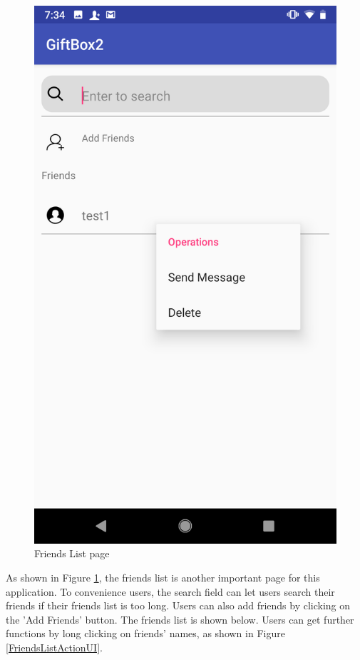 \begin{figure}[htb]
\begin{minipage}[t]{0.5\textwidth}
\includegraphics[width=.95\textwidth]{section03/assets/FriendsListAction.png}
\subcaption{\label{FriendsListActionUI}}
\end{minipage}%
\caption[Short Caption 2]{\label{WholeFriendsListUI}Friends List page}
\end{figure}

\par As shown in Figure \ref{WholeFriendsListUI}, the friends list is another important page for this application. To convenience users, the search field can let users search their friends if their friends list is too long. Users can also add friends by clicking on the 'Add Friends' button. The friends list is shown below. Users can get further functions by long clicking on friends' names, as shown in Figure \ref{FriendsListActionUI}. 

